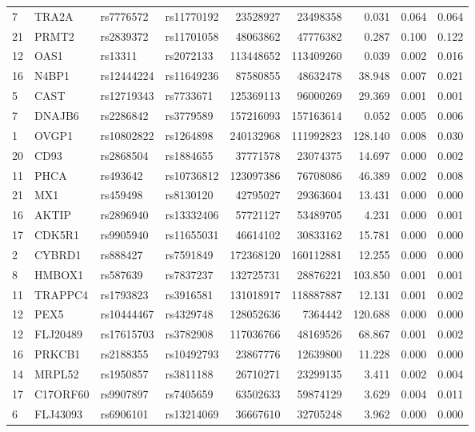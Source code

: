\documentclass{article}
\begin{document}
\begin{table}[ht]
{\begin{threeparttable}
\begin{tabular}{llllrrrrr}
7 & TRA2A & rs7776572 & rs11770192 & 23528927 & 23498358 & 0.031 & 0.064 & 0.064 \\
21 & PRMT2 & rs2839372 & rs11701058 & 48063862 & 47776382 & 0.287 & 0.100 & 0.122 \\
12 & OAS1 & rs13311 & rs2072133 & 113448652 & 113409260 & 0.039 & 0.002 & 0.016 \\
16 & N4BP1 & rs12444224 & rs11649236 & 87580855 & 48632478 & 38.948 & 0.007 & 0.021 \\
5 & CAST & rs12719343 & rs7733671 & 125369113 & 96000269 & 29.369 & 0.001 & 0.001 \\
7 & DNAJB6 & rs2286842 & rs3779589 & 157216093 & 157163614 & 0.052 & 0.005 & 0.006 \\
1 & OVGP1 & rs10802822 & rs1264898 & 240132968 & 111992823 & 128.140 & 0.008 & 0.030 \\
20 & CD93 & rs2868504 & rs1884655 & 37771578 & 23074375 & 14.697 & 0.000 & 0.002 \\
11 & PHCA & rs493642 & rs10736812 & 123097386 & 76708086 & 46.389 & 0.002 & 0.008 \\
21 & MX1 & rs459498 & rs8130120 & 42795027 & 29363604 & 13.431 & 0.000 & 0.000 \\
16 & AKTIP & rs2896940 & rs13332406 & 57721127 & 53489705 & 4.231 & 0.000 & 0.001 \\
17 & CDK5R1 & rs9905940 & rs11655031 & 46614102 & 30833162 & 15.781 & 0.000 & 0.000 \\
2 & CYBRD1 & rs888427 & rs7591849 & 172368120 & 160112881 & 12.255 & 0.000 & 0.000 \\
8 & HMBOX1 & rs587639 & rs7837237 & 132725731 & 28876221 & 103.850 & 0.001 & 0.001 \\
11 & TRAPPC4 & rs1793823 & rs3916581 & 131018917 & 118887887 & 12.131 & 0.001 & 0.002 \\
12 & PEX5 & rs10444467 & rs4329748 & 128052636 & 7364442 & 120.688 & 0.000 & 0.000 \\
12 & FLJ20489 & rs17615703 & rs3782908 & 117036766 & 48169526 & 68.867 & 0.001 & 0.002 \\
16 & PRKCB1 & rs2188355 & rs10492793 & 23867776 & 12639800 & 11.228 & 0.000 & 0.000 \\
14 & MRPL52 & rs1950857 & rs3811188 & 26710271 & 23299135 & 3.411 & 0.002 & 0.004 \\
17 & C17ORF60 & rs9907897 & rs7405659 & 63502633 & 59874129 & 3.629 & 0.004 & 0.011 \\
6 & FLJ43093 & rs6906101 & rs13214069 & 36667610 & 32705248 & 3.962 & 0.000 & 0.000 \\

\end{tabular}
\end{threeparttable}}
\end{table}
\end{document}
